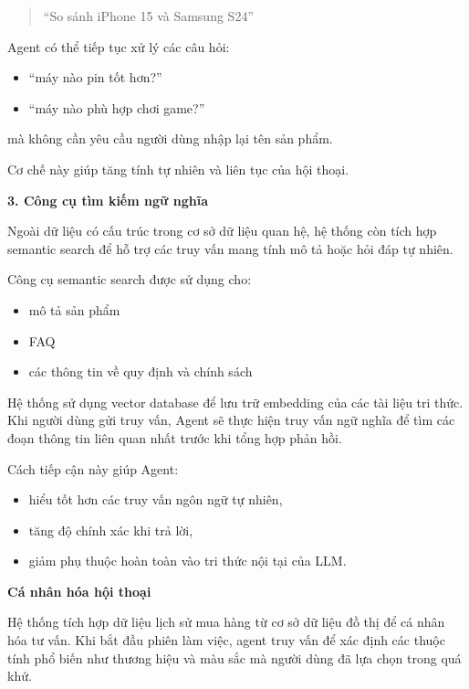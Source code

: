 \begin{quote}
    ``So sánh iPhone 15 và Samsung S24''
\end{quote}

Agent có thể tiếp tục xử lý các câu hỏi:

\begin{itemize}
    \item ``máy nào pin tốt hơn?''
    \item ``máy nào phù hợp chơi game?''
\end{itemize}

mà không cần yêu cầu người dùng nhập lại tên sản phẩm.

Cơ chế này giúp tăng tính tự nhiên và liên tục của hội thoại.

\textbf{3. Công cụ tìm kiếm ngữ nghĩa}

Ngoài dữ liệu có cấu trúc trong cơ sở dữ liệu quan hệ, hệ thống còn tích hợp semantic search để hỗ trợ các truy vấn mang tính mô tả hoặc hỏi đáp tự nhiên.

Công cụ semantic search được sử dụng cho:

\begin{itemize}
    \item mô tả sản phẩm
    \item FAQ
    \item các thông tin về quy định và chính sách
\end{itemize}

Hệ thống sử dụng vector database để lưu trữ embedding của các tài liệu tri thức. Khi người dùng gửi truy vấn, Agent sẽ thực hiện truy vấn ngữ nghĩa để tìm các đoạn thông tin liên quan nhất trước khi tổng hợp phản hồi.

Cách tiếp cận này giúp Agent:

\begin{itemize}
    \item hiểu tốt hơn các truy vấn ngôn ngữ tự nhiên,
    \item tăng độ chính xác khi trả lời,
    \item giảm phụ thuộc hoàn toàn vào tri thức nội tại của LLM.
\end{itemize}

\textbf{Cá nhân hóa hội thoại}

Hệ thống tích hợp dữ liệu lịch sử mua hàng từ cơ sở dữ liệu đồ thị để cá nhân hóa tư vấn. Khi bắt đầu phiên làm việc, agent truy vấn để xác định các thuộc tính phổ biến như thương hiệu và màu sắc mà người dùng đã lựa chọn trong quá khứ.

